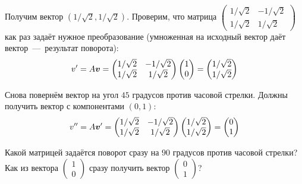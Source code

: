 \documentclass[a4paper,12pt]{article}
\begin{document}
  Получим вектор $\left(1/\sqrt{2}, 1/\sqrt{2}\right)$.
  Проверим, что матрица $\left(\begin{smallmatrix}1/\sqrt{2} & -1/\sqrt{2}\\ 1/\sqrt{2} & 1/\sqrt{2}\end{smallmatrix}\right)$ как раз задаёт нужное преобразование (умноженная на исходный вектор даёт вектор~---~результат поворота):
  \[
    v'
    = A \boldsymbol v
    = \begin{pmatrix}
        1/\sqrt{2} & -1/\sqrt{2}\\
        1/\sqrt{2} & 1/\sqrt{2}
      \end{pmatrix}
      \begin{pmatrix}
        1 \\ 0
      \end{pmatrix}
    = \begin{pmatrix}
        1/\sqrt{2} \\ 1/\sqrt{2}
      \end{pmatrix}
  \]
  
  Снова повернём вектор на угол $45$ градусов против часовой стрелки.
  Должны получить вектор с компонентами $(0, 1)$:
  \[
    v''
    = A \boldsymbol v'
    = \begin{pmatrix}
        1/\sqrt{2} & -1/\sqrt{2}\\
        1/\sqrt{2} & 1/\sqrt{2}
      \end{pmatrix}
      \begin{pmatrix}
        1/\sqrt{2} \\ 1/\sqrt{2}
      \end{pmatrix}
    = \begin{pmatrix}
        0 \\ 1
      \end{pmatrix}
  \]
  
  Какой матрицей задаётся поворот сразу на $90$ градусов против часовой стрелки?
  Как из вектора
  $\left(\begin{smallmatrix}1 \\ 0\end{smallmatrix}\right)$
  сразу получить вектор
  $\left(\begin{smallmatrix}0 \\ 1\end{smallmatrix}\right)$?
  
\end{document}
